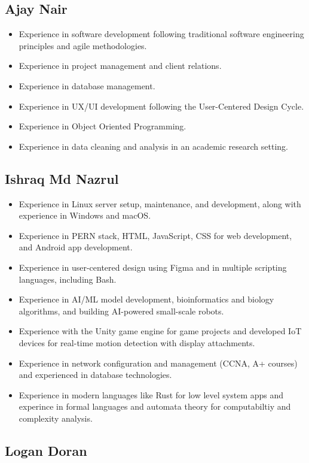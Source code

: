 \documentclass[12pt]{article}
\begin{document}
{\tiny\subsection*{Ajay Nair}}
\begin{itemize}
    \item Experience in software development following traditional software engineering principles and agile methodologies. 
    \item Experience in project management and client relations. 
    \item Experience in database management.
    \item Experience in UX/UI development following the User-Centered Design Cycle.
    \item Experience in Object Oriented Programming.
    \item Experience in data cleaning and analysis in an academic research setting.
\end{itemize}
{\tiny\subsection*{Ishraq Md Nazrul}}
\begin{itemize}
    \item Experience in Linux server setup, maintenance, and development, along with experience in Windows and macOS.
    \item Experience in PERN stack, HTML, JavaScript, CSS for web development, and Android app development.
    \item Experience in user-centered design using Figma and in multiple scripting languages, including Bash.
    \item Experience in AI/ML model development, bioinformatics and biology algorithms, and building AI-powered small-scale robots.
    \item Experience with the Unity game engine for game projects and developed IoT devices for real-time motion detection with display attachments.
    \item Experience in network configuration and management (CCNA, A+ courses) and experienced in database technologies.
    \item Experience in modern languages like Rust for low level system apps and experince in formal languages and automata theory for computabiltiy and complexity analysis.
\end{itemize}
{\tiny\subsection*{Logan Doran}}
\end{document}
